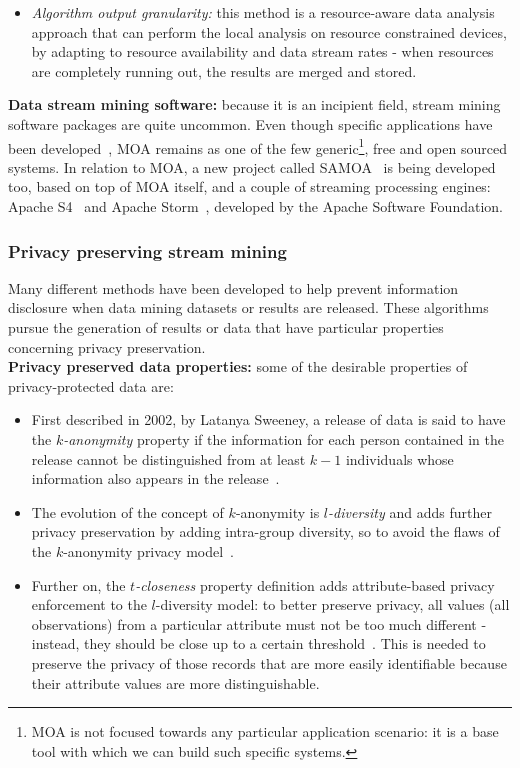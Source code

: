 \begin{itemize}
\begin{itemize}
		\item \textit{Algorithm output granularity:} this method is a resource-aware data analysis approach that can perform the local analysis on resource constrained devices, by adapting to resource availability and data stream rates - when resources are completely running out, the results are merged and stored.
	\end{itemize}
\end{itemize}

\textbf{Data stream mining software:} because it is an incipient field, stream mining software packages are quite uncommon. Even though specific applications have been developed~\cite{mineFleet}, MOA remains as one of the few generic\footnote{MOA is not focused towards any particular application scenario: it is a base tool with which we can build such specific systems.}, free and open sourced systems.
In relation to MOA, a new project called SAMOA~\cite{samoa} is being developed too, based on top of MOA itself, and a couple of streaming processing engines: Apache S4~\cite{apacheS4} and Apache Storm~\cite{apacheStorm}, developed by the Apache Software Foundation.

\subsubsection{Privacy preserving stream mining}

Many different methods have been developed to help prevent information disclosure when data mining datasets or results are released. These algorithms pursue the generation of results or data that have particular properties concerning privacy preservation.\\

\textbf{Privacy preserved data properties:} some of the desirable properties of privacy-protected data are:
\begin{itemize}
	\item First described in 2002, by Latanya Sweeney, a release of data is said to have the \textit{$k$-anonymity} property if the information for each person contained in the release cannot be distinguished from at least $k-1$ individuals whose information also appears in the release~\cite{kAnon}.
	
	\item The evolution of the concept of $k$-anonymity is \textit{$l$-diversity} and adds further privacy preservation by adding intra-group diversity, so to avoid the flaws of the $k$-anonymity privacy model~\cite{lDiversity}.
	
	\item Further on, the \textit{$t$-closeness} property definition adds attribute-based privacy enforcement to the $l$-diversity model: to better preserve privacy, all values (all observations) from a particular attribute must not be too much different - instead, they should be close up to a certain threshold~\cite{tCloseness}. This is needed to preserve the privacy of those records that are more easily identifiable because their attribute values are more distinguishable.
\end{itemize}

